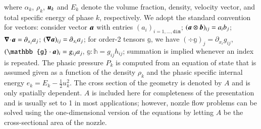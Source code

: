\documentclass[preprint,10pt]{elsarticle}
\begin{document}
%
where $\alpha_k$, $\rho_k$, $\boldsymbol u_k$ and $E_k$ denote the volume fraction, density,  velocity vector, and total specific 
energy of phase $k$, respectively. We adopt the standard convention for vectors: consider vector $\boldsymbol a$ with entries $(a_i)_{i=1,\ldots,\texttt{dim}}$; $
(\boldsymbol a \otimes \boldsymbol b)_{ij}=a_i b_j$;
$\boldsymbol\nabla\! \cdot \! \boldsymbol a= \partial_{x_j} a_j$; $(\boldsymbol\nabla \boldsymbol a)_{ij} = \partial_{x_i} a_j$; for order-2 tensors $\mathbb{g}$, 
we have $(\div \mathbb{g})_j = \partial_{x_i} g_{ij}$, $(\mathbb{g}\cdot \mbold{a})_i = g_{ij}a_j$, 
$\mathbb{g}:\mathbb{h} = g_{ij} h_{ij}$; summation is implied whenever an index is repeated. 
The phasic pressure $P_k$ is computed from an equation of state that is assumed given as a function of the density $\rho_k$ and 
the phasic specific internal energy $e_k = E_k - \tfrac{1}{2} u^2_k$. The cross section of the geometry is denoted by $A$ and is only 
spatially dependent. $A$ is included here for completeness of the presentation and is usually set to 1 in most applications; however, 
nozzle flow problems can be solved using the one-dimensional version of the equations by letting $A$ be the cross-sectional area 
of the nozzle. 
\end{document}
